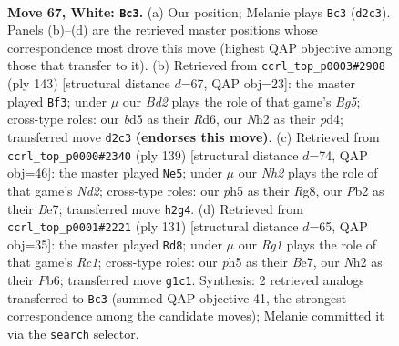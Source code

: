 \documentclass[11pt]{article}
\begin{document}
\clearpage

\begin{figure}[p]\centering
\begin{subfigure}{0.46\textwidth}\centering
\resizebox{\linewidth}{!}{%
\newchessgame
\chessboard[
  setfen={6k1/6p1/p2br2r/Pppb1p1p/2p2P1P/4P1P1/1P1BK2N/1R4R1 w - - 6 67},
  showmover=false,
  pgfstyle=straightmove, color=movearrow, markmove={d2-c3}
]}
\caption{}
\end{subfigure}\hfill
\begin{subfigure}{0.46\textwidth}\centering
\resizebox{\linewidth}{!}{%
\newchessgame
\chessboard[
  setfen={8/r4pk1/1p1r4/1B1p3p/P1pPp1bP/4P1P1/PR3P2/1R3K2 b - - 56 72},
  showmover=false,
  pgfstyle=straightmove, color=movearrow, markmove={g4-f3}
]}
\caption{}
\end{subfigure}
\\[4pt]
\begin{subfigure}{0.46\textwidth}\centering
\resizebox{\linewidth}{!}{%
\newchessgame
\chessboard[
  setfen={5rr1/3nbp1k/b2p2pP/N1pP4/p3PB2/P5R1/1PB5/6RK b - - 0 70},
  showmover=false,
  pgfstyle=straightmove, color=movearrow, markmove={d7-e5}
]}
\caption{}
\end{subfigure}\hfill
\begin{subfigure}{0.46\textwidth}\centering
\resizebox{\linewidth}{!}{%
\newchessgame
\chessboard[
  setfen={2r5/p3bkp1/Ppr1p1p1/5pP1/3P1P1P/n1PB1K2/4R3/R3B3 b - - 46 66},
  showmover=false,
  pgfstyle=straightmove, color=movearrow, markmove={c8-d8}
]}
\caption{}
\end{subfigure}
\caption{\textbf{Move 67, White: \texttt{Bc3}.} (a) Our position; Melanie plays \texttt{Bc3} (\texttt{d2c3}). Panels (b)--(d) are the retrieved master positions whose correspondence most drove this move (highest QAP objective among those that transfer to it). (b) Retrieved from \texttt{ccrl\_top\_p0003\#2908} (ply 143) [structural distance $d$=67, QAP obj=23]: the master played \texttt{Bf3}; under $\mu$ our \emph{Bd2} plays the role of that game's \emph{Bg5}; cross-type roles: our \emph{b}d5 as their \emph{R}d6, our \emph{N}h2 as their \emph{p}d4; transferred move \texttt{d2c3} \textbf{(endorses this move)}. (c) Retrieved from \texttt{ccrl\_top\_p0000\#2340} (ply 139) [structural distance $d$=74, QAP obj=46]: the master played \texttt{Ne5}; under $\mu$ our \emph{Nh2} plays the role of that game's \emph{Nd2}; cross-type roles: our \emph{p}h5 as their \emph{R}g8, our \emph{P}b2 as their \emph{B}e7; transferred move \texttt{h2g4}. (d) Retrieved from \texttt{ccrl\_top\_p0001\#2221} (ply 131) [structural distance $d$=65, QAP obj=35]: the master played \texttt{Rd8}; under $\mu$ our \emph{Rg1} plays the role of that game's \emph{Rc1}; cross-type roles: our \emph{p}h5 as their \emph{B}e7, our \emph{N}h2 as their \emph{P}b6; transferred move \texttt{g1c1}. Synthesis: 2 retrieved analogs transferred to \texttt{Bc3} (summed QAP objective 41, the strongest correspondence among the candidate moves); Melanie committed it via the \texttt{search} selector.}
\label{fig:thought-m132}
\end{figure}
\end{document}
